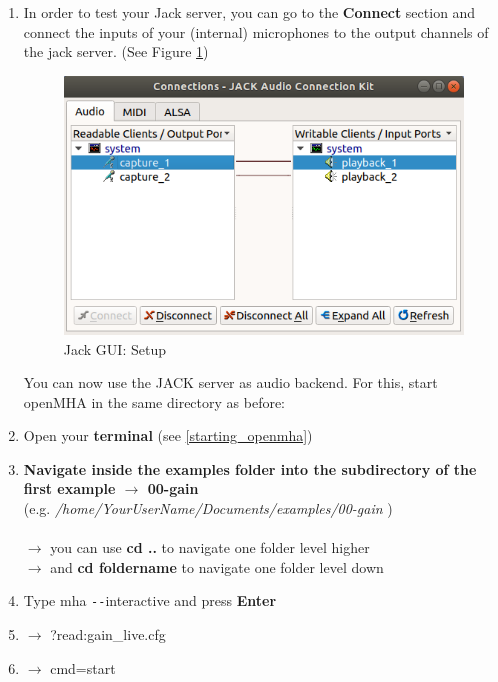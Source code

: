 \documentclass[11pt,a4paper,twoside]{article}
\newcommand{\+}{\discretionary{\mbox{\scriptsize$\hookleftarrow$}}{}{}}
\begin{document}
{{{\begin{enumerate}
\item In order to test your Jack server, you can go to the \textbf{Connect} section and connect the inputs of your (internal) microphones to the output channels of the jack server. (See Figure \ref{fig: jack_connection})

\begin{figure}[H]
\centering
\includegraphics[scale=0.4]{jack_connection.png}
\caption{Jack GUI: Setup}
\label{fig: jack_connection}
\end{figure}


You can now use the JACK server as audio backend. For this, start openMHA in the same directory as before:

\item Open your \textbf{terminal} (see \ref{starting_openmha})
    \item \textbf{Navigate inside the examples folder into the subdirectory of the first example $\rightarrow$ \textbf{00-gain}} \\ (e.g. \textit{/home/YourUserName/Documents/examples/00-gain} )\\ \\
    $\rightarrow$ you can use \textbf{cd ..} to navigate one folder level higher \\
    $\rightarrow$ and \textbf{cd foldername} to navigate one folder level down
    \item Type {{\ttfamily mha \texttt{-{}-}interactive}} and press \textbf{Enter}
 
\item $\rightarrow$ {\ttfamily ?read:gain\_live.cfg}
    \item $\rightarrow$ {\ttfamily cmd=start}


\end{enumerate}}}}
\end{document}
